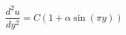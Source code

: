 \documentclass[preview,border=2pt]{standalone}
\begin{document}
\[
\frac{d^{2}u}{dy^{2}} = C(1+\alpha\sin(\pi y))
\]
\end{document}
